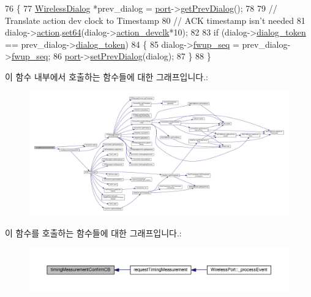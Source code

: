 \begin{DoxyCode}
76 \{
77     \hyperlink{class_wireless_dialog}{WirelessDialog} *prev\_dialog = \hyperlink{class_wireless_timestamper_a16e2f76ce8715713c1d3db843c27d2d3}{port}->\hyperlink{class_wireless_port_a93390615d971208a624aa77a494c72ce}{getPrevDialog}();
78 
79     \textcolor{comment}{// Translate action dev clock to Timestamp}
80     \textcolor{comment}{// ACK timestamp isn't needed}
81     dialog->\hyperlink{class_wireless_dialog_ad462f9a02358b1e73c51bca4328b8e21}{action}.\hyperlink{class_timestamp_aa62b073d8565fc6536122e8c27351f5c}{set64}(dialog->\hyperlink{class_wireless_dialog_a6694b46dc5b3e07f3e7fb085db34c24b}{action\_devclk}*10);
82 
83     \textcolor{keywordflow}{if} (dialog->\hyperlink{class_wireless_dialog_af4c116e249b109ded342c6ae740980ef}{dialog\_token} == prev\_dialog->\hyperlink{class_wireless_dialog_af4c116e249b109ded342c6ae740980ef}{dialog\_token})
84     \{
85         dialog->\hyperlink{class_wireless_dialog_a2643314d71609e165f5c5b2024fa6e96}{fwup\_seq} = prev\_dialog->\hyperlink{class_wireless_dialog_a2643314d71609e165f5c5b2024fa6e96}{fwup\_seq};
86         \hyperlink{class_wireless_timestamper_a16e2f76ce8715713c1d3db843c27d2d3}{port}->\hyperlink{class_wireless_port_a30565b46f08e3140cfd988e7dab46589}{setPrevDialog}(dialog);
87     \}
88 \}
\end{DoxyCode}


이 함수 내부에서 호출하는 함수들에 대한 그래프입니다.\+:
\nopagebreak
\begin{figure}[H]
\begin{center}
\leavevmode
\includegraphics[width=350pt]{class_wireless_timestamper_a8713624d1ec4485e5cd96df10248bbd2_cgraph}
\end{center}
\end{figure}




이 함수를 호출하는 함수들에 대한 그래프입니다.\+:
\nopagebreak
\begin{figure}[H]
\begin{center}
\leavevmode
\includegraphics[width=350pt]{class_wireless_timestamper_a8713624d1ec4485e5cd96df10248bbd2_icgraph}
\end{center}
\end{figure}




